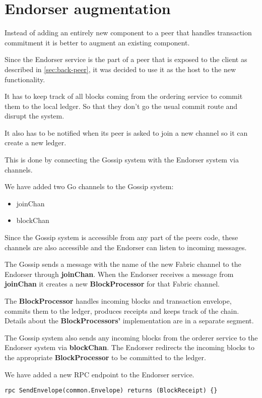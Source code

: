 \section{Endorser augmentation}
\label{sec:augm}
Instead of adding an entirely new component to a peer that handles transaction commitment it is better to augment an existing component.

Since the Endorser service is the part of a peer that is exposed to the client as described in \ref{sec:back-peer}, it was decided to use it as the host to the new functionality.

It has to keep track of all blocks coming from the ordering service to commit them to the local ledger. So that they don't go the usual commit route and disrupt the system.

It also has to be notified when its peer is asked to join a new channel so it can create a new ledger.

This is done by connecting the Gossip system with the Endorser system via channels.

We have added two Go channels to the Gossip system:
\begin{itemize}
  \item joinChan
  \item blockChan
\end{itemize}

Since the Gossip system is accessible from any part of the peers code, these channels are also accessible and the Endorser can listen to incoming messages.

The Gossip sends a message with the name of the new Fabric channel to the Endorser through \textbf{joinChan}.
When the Endorser receives a message from \textbf{joinChan} it creates a new \textbf{BlockProcessor} for that Fabric channel.

The \textbf{BlockProcessor} handles incoming blocks and transaction envelope, commits them to the ledger, produces receipts and keeps track of the chain. Details about the \textbf{BlockProcessors'} implementation are in a separate segment.

The Gossip system also sends any incoming blocks from the orderer service to the Endorser system via \textbf{blockChan}.
The Endorser redirects the incoming blocks to the appropriate \textbf{BlockProcessor} to be committed to the ledger.

We have added a new RPC endpoint to the Endorser service.

\begin{lstlisting}
rpc SendEnvelope(common.Envelope) returns (BlockReceipt) {}
\end{lstlisting}

